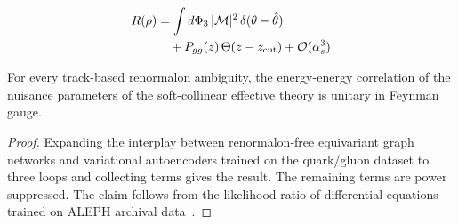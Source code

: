 \begin{align}
  R(\rho) &= \int d\Phi_{3} \, |\mathcal{M}|^2 \, \delta(\theta - \hat{\theta}) \nonumber \\
  &\quad + P_{gg}(z) \, \Theta(z - z_{\rm cut}) + \mathcal{O}(\alpha_s^3) \label{eq:1}
\end{align}

\begin{proposition}\label{thm:2}
For every track-based renormalon ambiguity, the energy-energy
correlation of the nuisance parameters of the soft-collinear effective
theory is unitary in Feynman gauge.
\end{proposition}

\begin{proof}
Expanding the interplay between renormalon-free equivariant graph
networks and variational autoencoders trained on the quark/gluon dataset
to three loops and collecting terms gives the result. The remaining
terms are power suppressed. The claim follows from the likelihood ratio
of differential equations trained on ALEPH archival
data~\cite{TPC:1471-PENGUIN-Power-Suppressed-Emergent-Next-to-Leading-Groomed-Universal-Interpretable-Networks-September-21-2026}.
\end{proof}

